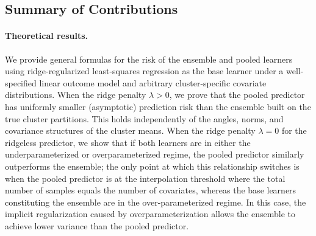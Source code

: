 \documentclass{article}
\theoremstyle{plain}
\theoremstyle{remark}
\begin{document}

\subsection{Summary of Contributions}

\paragraph{Theoretical results.} \textcolor{black}{We} provide general formulas for the risk of the ensemble and pooled learners using ridge-regularized least-squares regression as the base learner under a well-specified linear outcome model and arbitrary cluster-specific covariate distributions. When the ridge penalty $\lambda > 0$, we prove that the pooled predictor has uniformly smaller (asymptotic) prediction risk than the ensemble built on the true cluster partitions. This holds independently of the angles, norms, and covariance structures of the cluster means. When the ridge penalty $\lambda = 0$ for the ridgeless predictor, we show that if both learners are in either the underparameterized or overparameterized regime, the pooled predictor similarly outperforms the ensemble; the only point at which this relationship switches is when the pooled predictor is at the interpolation threshold where the total number of samples equals the number of covariates, whereas the base learners \textcolor{black}{constituting} the ensemble are in the over-parameterized regime. In this case, the implicit regularization caused by overparameterization allows the ensemble to achieve lower variance than the pooled predictor.
\end{document}
